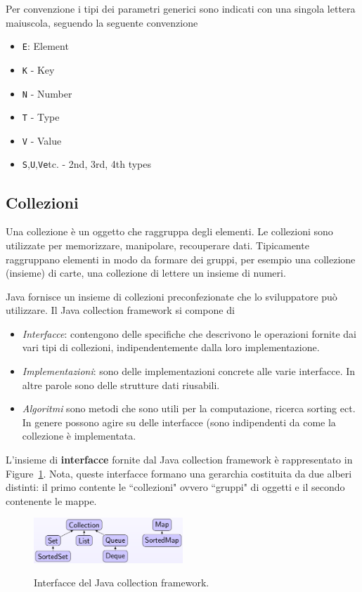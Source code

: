 \documentclass{article}
\begin{document}
Per convenzione i tipi dei parametri generici sono indicati con una singola lettera maiuscola, seguendo la seguente convenzione
\begin{itemize}
\item \texttt{E}: Element
\item \texttt{K} - Key
\item \texttt{N} - Number
\item \texttt{T} - Type
\item \texttt{V} - Value
\item \texttt{S},\texttt{U},\texttt{V}\texttt etc. - 2nd, 3rd, 4th types
\end{itemize}



\subsection{Collezioni}
Una collezione \`e un oggetto che raggruppa degli elementi. Le collezioni sono utilizzate per memorizzare, manipolare, recouperare dati. Tipicamente raggruppano elementi in modo da formare dei gruppi, per esempio una collezione (insieme) di carte, una collezione di lettere un insieme di numeri. 

Java fornisce un insieme di collezioni preconfezionate che lo sviluppatore pu\`o utilizzare. Il Java collection framework si compone di 
\begin{itemize}
\item \emph{Interfacce}: contengono delle specifiche che descrivono le operazioni fornite dai vari tipi di collezioni, indipendentemente dalla loro implementazione. 
\item \emph{Implementazioni}: sono delle implementazioni concrete alle varie interfacce. In altre parole sono delle strutture dati riusabili.
\item \emph{Algoritmi} sono metodi che sono utili per la computazione, ricerca sorting ect. In genere possono agire su delle interfacce (sono indipendenti da come la collezione \`e implementata. 
\end{itemize}

L'insieme di \textbf{interfacce} fornite dal Java collection framework \`e rappresentato in Figure~\ref{Fig:collections}. Nota, queste interfacce formano una gerarchia costituita da due alberi distinti: il primo contente le ``collezioni" ovvero ``gruppi" di oggetti e il secondo contenente le mappe.

\begin{figure}[h!]
  \centering
    \includegraphics[width=0.5\textwidth]{colls-coreInterfaces.png}
    \label{Fig:collections}
  \caption{Interfacce del  Java collection framework.}
\end{figure}
\end{document}
